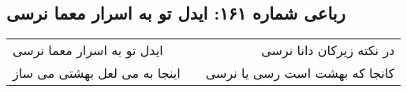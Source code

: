 \begin{center}
\section*{رباعی شماره ۱۶۱: ایدل تو به اسرار معما نرسی}
\label{sec:sh161}
\begin{longtable}{l p{0.5cm} r}
ایدل تو به اسرار معما نرسی
&&
در نکته زیرکان دانا نرسی
\\
اینجا به می لعل بهشتی می ساز
&&
کانجا که بهشت است رسی یا نرسی
\\
\end{longtable}
\end{center}
